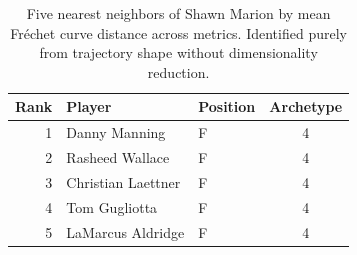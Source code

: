 \begin{table}[htbp]
  \centering\small
  \begin{tabular}{rllc}
    \toprule
    Rank & Player & Position & Archetype \\
    \midrule
    1 & Danny Manning & F & 4 \\
    2 & Rasheed Wallace & F & 4 \\
    3 & Christian Laettner & F & 4 \\
    4 & Tom Gugliotta & F & 4 \\
    5 & LaMarcus Aldridge & F & 4 \\
    \bottomrule
  \end{tabular}
  \caption{Five nearest neighbors of Shawn Marion by mean Fr\'{e}chet curve distance across metrics. Identified purely from trajectory shape without dimensionality reduction.}
  \label{tab:Shawn_Marion_frechet_curve_neighbors}
\end{table}

